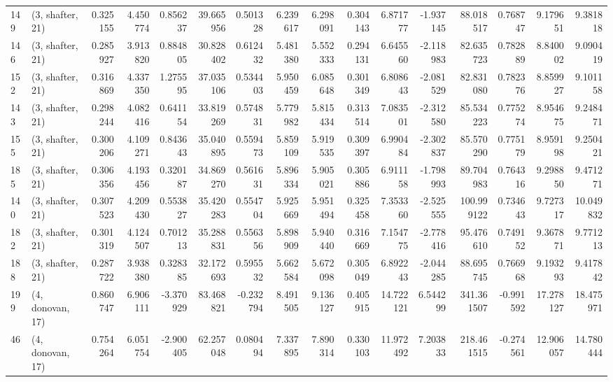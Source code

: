 \begin{tabular}{llrrrrrrrrrrrrrr}
149 &  (3, shafter, 21) &   0.325155 &   4.450774 &  0.856237 &   39.665956 &  0.501328 &   6.239617 &   6.298091 &  0.304143 &   6.871777 &  -1.937145 &   88.018517 &  0.768747 &   9.179651 &   9.381818 \\
146 &  (3, shafter, 21) &   0.285927 &   3.913820 &  0.884805 &   30.828402 &  0.612432 &   5.481380 &   5.552333 &  0.294131 &   6.645560 &  -2.118983 &   82.635723 &  0.782889 &   8.840002 &   9.090419 \\
152 &  (3, shafter, 21) &   0.316869 &   4.337350 &  1.275595 &   37.035106 &  0.534403 &   5.950459 &   6.085648 &  0.301349 &   6.808643 &  -2.081529 &   82.831080 &  0.782376 &   8.859927 &   9.101158 \\
143 &  (3, shafter, 21) &   0.298244 &   4.082416 &  0.641154 &   33.819269 &  0.574831 &   5.779982 &   5.815434 &  0.313514 &   7.083501 &  -2.312580 &   85.534223 &  0.775274 &   8.954675 &   9.248471 \\
155 &  (3, shafter, 21) &   0.300206 &   4.109271 &  0.843643 &   35.040895 &  0.559473 &   5.859109 &   5.919535 &  0.309397 &   6.990484 &  -2.302837 &   85.570290 &  0.775179 &   8.959198 &   9.250421 \\
185 &  (3, shafter, 21) &   0.306356 &   4.193456 &  0.320187 &   34.869270 &  0.561631 &   5.896334 &   5.905021 &  0.305886 &   6.911158 &  -1.798993 &   89.704983 &  0.764316 &   9.298850 &   9.471271 \\
140 &  (3, shafter, 21) &   0.307523 &   4.209430 &  0.553827 &   35.420283 &  0.554704 &   5.925669 &   5.951494 &  0.325458 &   7.353360 &  -2.525555 &  100.999122 &  0.734643 &   9.727317 &  10.049832 \\
182 &  (3, shafter, 21) &   0.301319 &   4.124507 &  0.701213 &   35.288831 &  0.556356 &   5.898909 &   5.940440 &  0.316669 &   7.154775 &  -2.778416 &   95.476610 &  0.749152 &   9.367871 &   9.771213 \\
188 &  (3, shafter, 21) &   0.287722 &   3.938380 &  0.328385 &   32.172693 &  0.595532 &   5.662584 &   5.672098 &  0.305049 &   6.892243 &  -2.044285 &   88.695745 &  0.766968 &   9.193293 &   9.417842 \\
199 &  (4, donovan, 17) &   0.860747 &   6.906111 & -3.370929 &   83.468821 & -0.232794 &   8.491505 &   9.136127 &  0.405915 &  14.722121 &   6.544299 &  341.361507 & -0.991592 &  17.278127 &  18.475971 \\
46  &  (4, donovan, 17) &   0.754264 &   6.051754 & -2.900405 &   62.257048 &  0.080494 &   7.337895 &   7.890314 &  0.330103 &  11.972492 &   7.203833 &  218.461515 & -0.274561 &  12.906057 &  14.780444 \\

\end{tabular}
